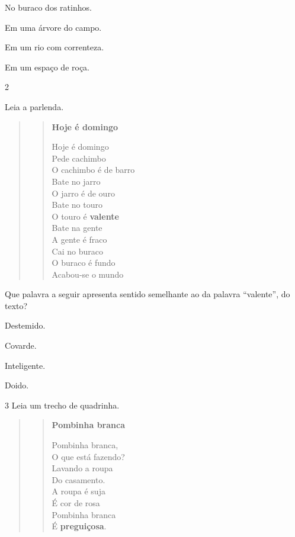 \begin{escolha}
\item No buraco dos ratinhos.

\item Em uma árvore do campo.

\item Em um rio com correnteza.

\item Em um espaço de roça.
\end{escolha}


\num{2}

Leia a parlenda.

\begin{quote}
\begin{verse}
\textbf{Hoje é domingo}

Hoje é domingo\\
Pede cachimbo\\
O cachimbo é de barro\\
Bate no jarro\\
O jarro é de ouro\\
Bate no touro\\
O touro é \textbf{valente}\\
Bate na gente\\
A gente é fraco\\
Cai no buraco\\
O buraco é fundo\\
Acabou-se o mundo

\end{verse}
\end{quote}

\pagebreak
Que palavra a seguir apresenta sentido semelhante ao da palavra
``valente'', do texto?

\begin{escolha}
\item Destemido.

\item Covarde.

\item Inteligente.

\item Doido.
\end{escolha}

\num{3} Leia um trecho de quadrinha.

\begin{quote}
\begin{verse}
\textbf{Pombinha branca}

Pombinha branca,\\
O que está fazendo?\\
Lavando a roupa\\
Do casamento.\\
A roupa é suja\\
É cor de rosa\\
Pombinha branca\\
É \textbf{preguiçosa}.

\end{verse}
\end{quote}

